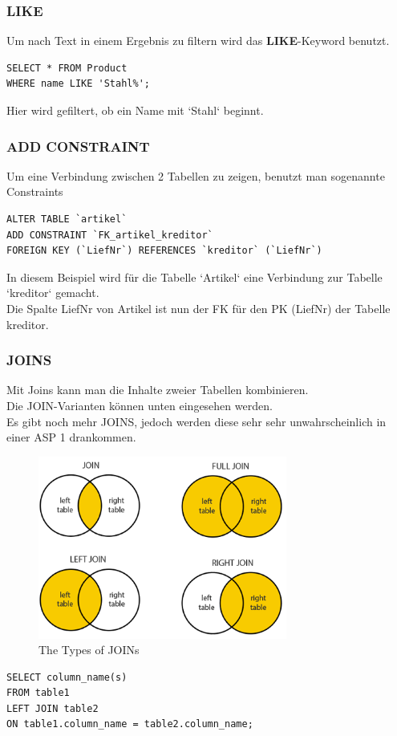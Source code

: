\documentclass[10pt]{article}
\begin{document}
\subsubsection{LIKE}
Um nach Text in einem Ergebnis zu filtern wird das \textbf{LIKE}-Keyword benutzt.
\begin{lstlisting}
SELECT * FROM Product
WHERE name LIKE 'Stahl%';
\end{lstlisting}
Hier wird gefiltert,  ob ein Name mit  `Stahl` beginnt.

\subsubsection{ADD CONSTRAINT}
Um eine Verbindung zwischen 2 Tabellen zu zeigen, benutzt man sogenannte Constraints
\begin{lstlisting}
ALTER TABLE `artikel`
ADD CONSTRAINT `FK_artikel_kreditor` 
FOREIGN KEY (`LiefNr`) REFERENCES `kreditor` (`LiefNr`)
\end{lstlisting}
In diesem Beispiel wird für die Tabelle `Artikel` eine Verbindung zur Tabelle `kreditor` gemacht. \\
Die Spalte LiefNr von Artikel ist nun der FK für den PK (LiefNr) der Tabelle kreditor.

\subsubsection{JOINS}
Mit Joins kann  man die  Inhalte zweier Tabellen  kombinieren. \\
Die JOIN-Varianten können unten eingesehen werden. \\
Es gibt noch mehr JOINS, jedoch werden diese sehr sehr unwahrscheinlich in einer ASP 1 drankommen.
\begin{figure}[H]
	\begin{center}
		\includegraphics[height=6cm]{joins.png}
	\end{center}
  \caption{The Types of JOINs}
  \label{fig:types of joins}
\end{figure}
\begin{lstlisting}
SELECT column_name(s)
FROM table1
LEFT JOIN table2
ON table1.column_name = table2.column_name;
\end{lstlisting}
\end{document}
